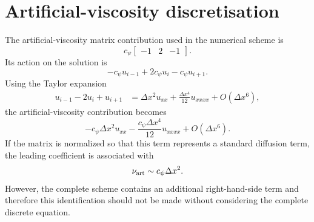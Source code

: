 \documentclass{mooiman_memo}
\begin{document}
\section{Artificial-viscosity discretisation}
%
The artificial-viscosity matrix contribution used in the numerical
scheme is
%
\begin{equation}
    c_\psi
    \begin{bmatrix}
        -1 & 2 & -1
    \end{bmatrix}.
\end{equation}
%
Its action on the solution is
%
\begin{equation}
    -c_\psi u_{i-1}
    +2c_\psi u_i
    -c_\psi u_{i+1}.
\end{equation}
%
Using the Taylor expansion
%
\begin{align}
    u_{i-1}-2u_i+u_{i+1}
    &=
    \Delta x^2u_{xx}
    +\frac{\Delta x^4}{12}u_{xxxx}
    +O(\Delta x^6),
\end{align}
%
the artificial-viscosity contribution becomes
%
\begin{equation}
    \boxed{
    -c_\psi\Delta x^2u_{xx}
    -\frac{c_\psi\Delta x^4}{12}u_{xxxx}
    +O(\Delta x^6).
    }
\end{equation}
%
If the matrix is normalized so that this term represents a standard
diffusion term, the leading coefficient is associated with
%
\begin{equation}
    \nu_{\rm art}\sim c_\psi\Delta x^2.
\end{equation}
%
However, the complete scheme contains an additional right-hand-side
term and therefore this identification should not be made without
considering the complete discrete equation.
%
\end{document}
